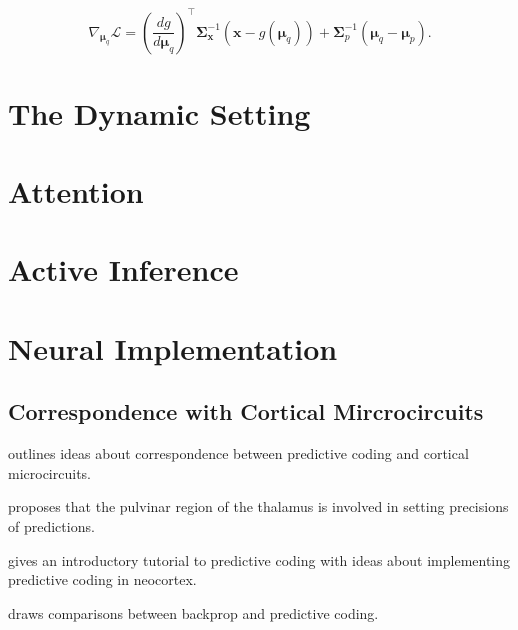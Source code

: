 \begin{equation}
	\nabla_{\bm{\mu}_q} \mathcal{L} =  \left( \frac{d g}{d \bm{\mu}_q} \right)^\intercal \bm{\Sigma}^{-1}_\mathbf{x} (\mathbf{x} - g(\bm{\mu}_q)) + \bm{\Sigma}^{-1}_p (\bm{\mu}_q - \bm{\mu}_p).
	\label{eq: multi-dimensional gradient}
\end{equation}

\section{The Dynamic Setting}

\section{Attention}

\section{Active Inference}

\section{Neural Implementation}

\subsection{Correspondence with Cortical Mircrocircuits}

\noindent \cite{bastos2012canonical} outlines ideas about correspondence between predictive coding and cortical microcircuits.
\newline

\noindent \cite{kanai2015cerebral} proposes that the pulvinar region of the thalamus is involved in setting precisions of predictions.
\newline

\noindent \cite{bogacz2017tutorial} gives an introductory tutorial to predictive coding with ideas about implementing predictive coding in neocortex.
\newline

\noindent \cite{whittington2017approximation} draws comparisons between backprop and predictive coding.
\newline

